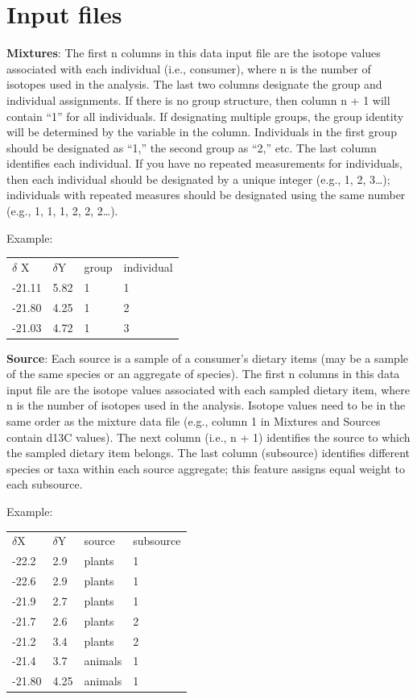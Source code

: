\documentclass{article}
\begin{document}
\section*{Input files}

\textbf{Mixtures}: The first n columns in this data input file are the isotope values associated with each individual (i.e., consumer), where n is the number of isotopes used in the analysis. The last two columns designate the group and individual assignments. If there is no group structure, then column n + 1 will contain “1” for all individuals. If designating multiple groups, the group identity will be determined by the variable in the column. Individuals in the first group should be designated as “1,” the second group as “2,” etc. The last column identifies each individual. If you have no repeated measurements for individuals, then each individual should be designated by a unique integer (e.g., 1, 2, 3…); individuals with repeated measures should be designated using the same number (e.g., 1, 1, 1, 2, 2, 2…). 

Example:
\begin{center}
\begin{tabular}{llll}
$\delta$ X & $\delta$Y & group & individual\\
-21.11 & 5.82 & 1 & 1\\
-21.80 & 4.25 & 1 & 2\\
-21.03 & 4.72 & 1 & 3
\end{tabular}
\end{center}

\textbf{Source}: Each source is a sample of a consumer’s dietary items (may be a sample of the same species or an aggregate of species). The first n columns in this data input file are the isotope values associated with each sampled dietary item, where n is the number of isotopes used in the analysis. Isotope values need to be in the same order as the mixture data file (e.g., column 1 in Mixtures and Sources contain d13C values). The next column (i.e., n + 1) identifies the source to which the sampled dietary item belongs. The last column (subsource) identifies different species or taxa within each source aggregate; this feature assigns equal weight to each subsource. 

Example:
\begin{center}
\begin{tabular}{llll}
$\delta$X & $\delta$Y & source & subsource\\
-22.2 & 2.9 & plants & 1\\
-22.6 & 2.9 & plants & 1\\
-21.9 & 2.7 & plants & 1\\
-21.7 & 2.6 & plants & 2\\
-21.2 & 3.4 & plants & 2\\
-21.4 & 3.7 & animals & 1\\
-21.80 & 4.25 & animals & 1\\
\end{tabular}
\end{center}
\end{document}
